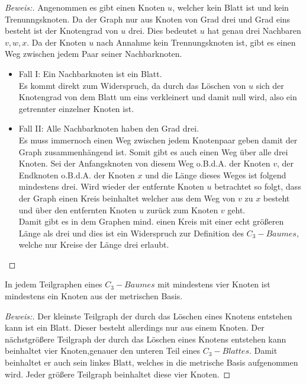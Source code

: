 \begin{proof}[Beweis:]
Angenommen es gibt einen Knoten $u$, welcher kein Blatt ist und kein Trenunngsknoten. Da der Graph nur aus Knoten von Grad drei und Grad eins besteht ist der Knotengrad von $u$ drei. Dies bedeutet $u$ hat genau drei Nachbaren $v,w,x$. Da
der Knoten $u$ nach Annahme kein Trennungsknoten ist, gibt es einen Weg zwischen jedem Paar seiner Nachbarknoten.
\begin{itemize}
\item Fall I: Ein Nachbarknoten ist ein Blatt.\\ Es kommt direkt zum Widerspruch, da durch das Löschen von $u$ sich der Knotengrad von dem Blatt um eins verkleinert und damit null wird, also ein getrennter einzelner Knoten ist.
\item Fall II: Alle Nachbarknoten haben den Grad drei.\\
Es muss immernoch einen Weg zwischen jedem Knotenpaar geben damit der Graph zusammenhängend ist. Somit gibt es auch einen Weg über alle drei Knoten. Sei der Anfangsknoten von diesem Weg o.B.d.A. der Knoten $v$, der Endknoten o.B.d.A. der Knoten $x$ und die Länge dieses Weges ist folgend mindestens drei. Wird wieder der entfernte Knoten $u$ betrachtet so folgt, dass der Graph einen Kreis beinhaltet welcher aus dem Weg von $v$ zu $x$ besteht und über den entfernten Knoten $u$ zurück zum Knoten $v$ geht.\\
Damit gibt es in dem Graphen mind. einen Kreis mit einer echt größeren Länge als drei und dies ist ein Widerspruch zur Definition des $C_{3}-Baumes$, welche nur Kreise der Länge drei erlaubt.
\end{itemize}
\end{proof}
\begin{lem}
\label{bkb2}
In jedem Teilgraphen eines $C_{3}-Baumes$ mit mindestens vier Knoten ist mindestens ein Knoten aus der metrischen Basis.
\end{lem}
\begin{proof}[Beweis:]
Der kleinste Teilgraph der durch das Löschen eines Knotens entstehen kann ist ein Blatt. Dieser besteht allerdings nur aus einem Knoten. Der nächstgrößere Teilgraph der durch das Löschen eines Knotens entstehen kann beinhaltet vier Knoten,genauer den unteren Teil eines $C_{3}-Blattes$. Damit beinhaltet er auch sein linkes Blatt, welches in die metrische Basis aufgenommen wird. Jeder größere Teilgraph beinhaltet diese vier Knoten. %
\end{proof}
